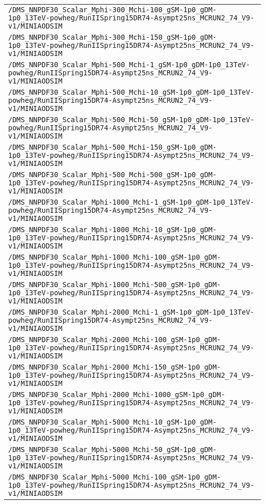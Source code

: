 \begin{center}
\begin{tabular}{l}
\verb!/DMS_NNPDF30_Scalar_Mphi-300_Mchi-100_gSM-1p0_gDM-1p0_13TeV-powheg/RunIISpring15DR74-Asympt25ns_MCRUN2_74_V9-v1/MINIAODSIM! \tabularnewline
\verb!/DMS_NNPDF30_Scalar_Mphi-300_Mchi-150_gSM-1p0_gDM-1p0_13TeV-powheg/RunIISpring15DR74-Asympt25ns_MCRUN2_74_V9-v1/MINIAODSIM! \tabularnewline
\verb!/DMS_NNPDF30_Scalar_Mphi-500_Mchi-1_gSM-1p0_gDM-1p0_13TeV-powheg/RunIISpring15DR74-Asympt25ns_MCRUN2_74_V9-v1/MINIAODSIM! \tabularnewline
\verb!/DMS_NNPDF30_Scalar_Mphi-500_Mchi-10_gSM-1p0_gDM-1p0_13TeV-powheg/RunIISpring15DR74-Asympt25ns_MCRUN2_74_V9-v1/MINIAODSIM! \tabularnewline
\verb!/DMS_NNPDF30_Scalar_Mphi-500_Mchi-50_gSM-1p0_gDM-1p0_13TeV-powheg/RunIISpring15DR74-Asympt25ns_MCRUN2_74_V9-v1/MINIAODSIM! \tabularnewline
\verb!/DMS_NNPDF30_Scalar_Mphi-500_Mchi-150_gSM-1p0_gDM-1p0_13TeV-powheg/RunIISpring15DR74-Asympt25ns_MCRUN2_74_V9-v1/MINIAODSIM! \tabularnewline
\verb!/DMS_NNPDF30_Scalar_Mphi-500_Mchi-500_gSM-1p0_gDM-1p0_13TeV-powheg/RunIISpring15DR74-Asympt25ns_MCRUN2_74_V9-v1/MINIAODSIM! \tabularnewline
\verb!/DMS_NNPDF30_Scalar_Mphi-1000_Mchi-1_gSM-1p0_gDM-1p0_13TeV-powheg/RunIISpring15DR74-Asympt25ns_MCRUN2_74_V9-v1/MINIAODSIM! \tabularnewline
\verb!/DMS_NNPDF30_Scalar_Mphi-1000_Mchi-10_gSM-1p0_gDM-1p0_13TeV-powheg/RunIISpring15DR74-Asympt25ns_MCRUN2_74_V9-v1/MINIAODSIM! \tabularnewline
\verb!/DMS_NNPDF30_Scalar_Mphi-1000_Mchi-100_gSM-1p0_gDM-1p0_13TeV-powheg/RunIISpring15DR74-Asympt25ns_MCRUN2_74_V9-v1/MINIAODSIM! \tabularnewline
\verb!/DMS_NNPDF30_Scalar_Mphi-1000_Mchi-500_gSM-1p0_gDM-1p0_13TeV-powheg/RunIISpring15DR74-Asympt25ns_MCRUN2_74_V9-v1/MINIAODSIM! \tabularnewline
\verb!/DMS_NNPDF30_Scalar_Mphi-2000_Mchi-1_gSM-1p0_gDM-1p0_13TeV-powheg/RunIISpring15DR74-Asympt25ns_MCRUN2_74_V9-v1/MINIAODSIM! \tabularnewline
\verb!/DMS_NNPDF30_Scalar_Mphi-2000_Mchi-100_gSM-1p0_gDM-1p0_13TeV-powheg/RunIISpring15DR74-Asympt25ns_MCRUN2_74_V9-v1/MINIAODSIM! \tabularnewline
\verb!/DMS_NNPDF30_Scalar_Mphi-2000_Mchi-150_gSM-1p0_gDM-1p0_13TeV-powheg/RunIISpring15DR74-Asympt25ns_MCRUN2_74_V9-v1/MINIAODSIM! \tabularnewline
\verb!/DMS_NNPDF30_Scalar_Mphi-2000_Mchi-1000_gSM-1p0_gDM-1p0_13TeV-powheg/RunIISpring15DR74-Asympt25ns_MCRUN2_74_V9-v1/MINIAODSIM! \tabularnewline
\verb!/DMS_NNPDF30_Scalar_Mphi-5000_Mchi-10_gSM-1p0_gDM-1p0_13TeV-powheg/RunIISpring15DR74-Asympt25ns_MCRUN2_74_V9-v1/MINIAODSIM! \tabularnewline
\verb!/DMS_NNPDF30_Scalar_Mphi-5000_Mchi-50_gSM-1p0_gDM-1p0_13TeV-powheg/RunIISpring15DR74-Asympt25ns_MCRUN2_74_V9-v1/MINIAODSIM! \tabularnewline
\verb!/DMS_NNPDF30_Scalar_Mphi-5000_Mchi-100_gSM-1p0_gDM-1p0_13TeV-powheg/RunIISpring15DR74-Asympt25ns_MCRUN2_74_V9-v1/MINIAODSIM! \tabularnewline

\end{tabular}
\end{center}
